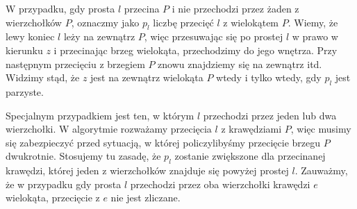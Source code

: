 W przypadku, gdy prosta $l$ przecina $P$ i nie przechodzi przez
żaden z wierzchołków $P$, oznaczmy jako $p_l$ liczbę przecięć $l$ z
wielokątem $P$. Wiemy, że lewy koniec $l$ leży na zewnątrz $P$, więc
przesuwając się po prostej $l$ w prawo w kierunku $z$ i przecinając
brzeg wielokąta, przechodzimy do jego wnętrza. Przy następnym
przecięciu z brzegiem $P$ znowu znajdziemy się na zewnątrz
itd. Widzimy stąd, że $z$ jest na zewnątrz wielokąta $P$ wtedy i
tylko wtedy, gdy $p_l$ jest parzyste.

\begin{figure}[htp]
  \centering
  \caption{}
\end{figure}

Specjalnym przypadkiem jest ten, w którym $l$ przechodzi przez
jeden lub dwa wierzchołki. W algorytmie rozważamy przecięcia $l$ z
krawędziami $P$, więc musimy się zabezpieczyć przed sytuacją, w
której policzylibyśmy przecięcie brzegu $P$ dwukrotnie. Stosujemy tu
zasadę, że $p_l$ zostanie zwiększone dla przecinanej krawędzi,
której jeden z wierzchołków znajduje się powyżej prostej
$l$. Zauważmy, że w przypadku gdy prosta $l$ przechodzi przez oba
wierzchołki krawędzi $e$ wielokąta, przecięcie z $e$ nie jest
zliczane.

